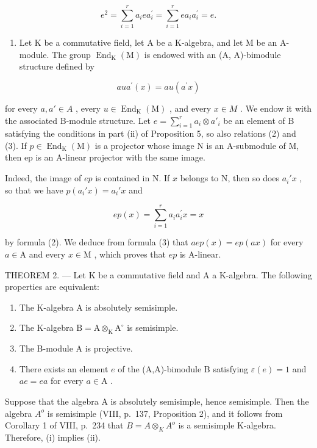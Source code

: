 \[
e ^ {2} = \sum_ {i = 1} ^ {r} a _ {i} e a _ {i} ^ {\prime} = \sum_ {i = 1} ^ {r} e a _ {i} a _ {i} ^ {\prime} = e.
\]

\begin{enumerate}
\def\labelenumi{\arabic{enumi})}
\setcounter{enumi}{1}
\tightlist
\item
  Let K be a commutative field, let A be a K-algebra, and let M be an A-module. The group \(\operatorname{End}_{\mathrm{K}}(\mathrm{M})\) is endowed with an (A, A)-bimodule structure defined by
\end{enumerate}

\[
a u a ^ {\prime} (x) = a u \left(a ^ {\prime} x\right)
\]

for every \(a, a' \in A\) , every \(u \in \operatorname{End}_{\mathrm{K}}(\mathrm{M})\) , and every \(x \in M\) . We endow it with the associated B-module structure. Let \(e = \sum_{i=1}^{r} a_i \otimes a'_i\) be an element of B satisfying the conditions in part (ii) of Proposition 5, so also relations (2) and (3). If \(p \in \operatorname{End}_{\mathrm{K}}(\mathrm{M})\) is a projector whose image N is an A-submodule of M, then ep is an A-linear projector with the same image.

Indeed, the image of \(ep\) is contained in N. If \(x\) belongs to N, then so does \(a_i' x\) , so that we have \(p(a_i' x) = a_i' x\) and

\[
e p (x) = \sum_ {i = 1} ^ {r} a _ {i} a _ {i} ^ {\prime} x = x
\]

by formula (2). We deduce from formula (3) that \(aep(x) = ep(ax)\) for every \(a \in \mathrm{A}\) and every \(x \in \mathrm{M}\) , which proves that \(ep\) is A-linear.

THEOREM 2. --- Let K be a commutative field and A a K-algebra. The following properties are equivalent:

\begin{enumerate}
\def\labelenumi{(\roman{enumi})}
\item
  The K-algebra A is absolutely semisimple.
\item
  The K-algebra \(\mathrm{B} = \mathrm{A}\otimes_{\mathrm{K}}\mathrm{A}^{\circ}\) is semisimple.
\item
  The B-module A is projective.
\item
  There exists an element \(e\) of the (A,A)-bimodule B satisfying \(\varepsilon(e) = 1\) and \(ae = ea\) for every \(a \in \mathrm{A}\) .
\end{enumerate}

Suppose that the algebra A is absolutely semisimple, hence semisimple. Then the algebra \(A^{o}\) is semisimple (VIII, p.~137, Proposition 2), and it follows from Corollary 1 of VIII, p.~234 that \(B = A \otimes_{K} A^{o}\) is a semisimple K-algebra. Therefore, (i) implies (ii).


